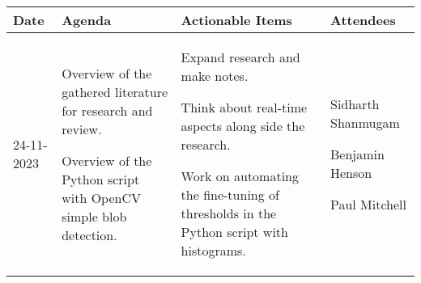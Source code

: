 \begin{table}[!h]
    \centering
    \begin{tabularx}{\textwidth}{|l|X|X|X|}
        \hline
        Date & Agenda & Actionable Items & Attendees \\
        \hline
        \hline
        24-11-2023 & 
        \begin{myitemize}
            \item Overview of the gathered literature for research and review.
            \item Overview of the Python script with OpenCV simple blob detection.
        \end{myitemize} & 
        \begin{myitemize}
            \item Expand research and make notes.
            \item Think about real-time aspects along side the research.
            \item Work on automating the fine-tuning of thresholds in the Python script with histograms.
        \end{myitemize} & 
        \begin{myitemize}
            \item Sidharth Shanmugam
            \item Benjamin Henson
            \item Paul Mitchell
        \end{myitemize} \\
        \hline
    \end{tabularx}
\end{table}
